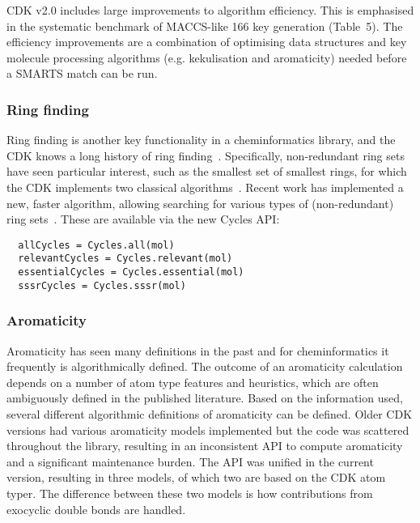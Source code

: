 \documentclass[doublespacing]{bmcart}
\def \cdkversion {v2.0}
\begin{document}
CDK \cdkversion{} includes large improvements to algorithm
efficiency. This is emphasised in the systematic benchmark
of MACCS-like 166 key generation (Table~5). The efficiency improvements
are a combination of optimising data structures and key molecule processing
algorithms (e.g. kekulisation and aromaticity) needed before a SMARTS
match can be run.
  


\subsubsection*{Ring finding}

Ring finding is another key functionality in a cheminformatics library, and
the CDK knows a long history of ring finding~\cite{Berger2004,May2014}. Specifically,
non-redundant ring sets have seen particular interest,
such as the smallest set of smallest rings, for which the CDK
implements two classical algorithms~\cite{Figueras1996,Berger2004}.
Recent work has implemented a new, faster algorithm, allowing
searching for various types of (non-redundant) ring
sets~\cite{May2014}. These are available via the new Cycles API:

\vspace{0.2cm}
\begin{verbatim}
  allCycles = Cycles.all(mol)
  relevantCycles = Cycles.relevant(mol)
  essentialCycles = Cycles.essential(mol)
  sssrCycles = Cycles.sssr(mol)
\end{verbatim}
\vspace{0.2cm}

\subsubsection*{Aromaticity}

Aromaticity has seen many definitions in the past and for
cheminformatics it frequently is algorithmically defined. The outcome
of an aromaticity calculation depends on a number of atom type
features and heuristics, which are often ambiguously defined in the
published literature. Based on the information used, several different
algorithmic definitions of aromaticity can be defined. Older CDK
versions had various aromaticity models implemented but the code was scattered
throughout the library, resulting in an inconsistent API
to compute aromaticity and a significant maintenance
burden.  The API was unified in the current version, resulting in three
models, of which two are based on the CDK atom typer. The difference
between these two models is how contributions from exocyclic double
bonds are handled.
\end{document}
